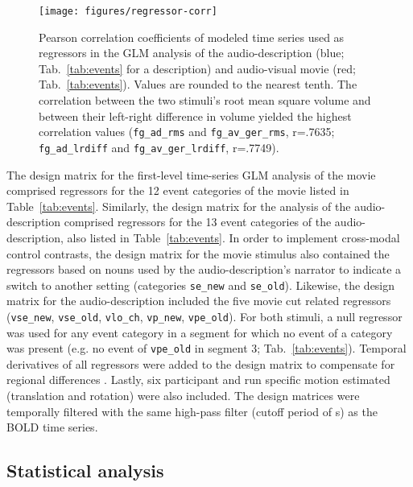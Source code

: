 \documentclass[english]{article}
\begin{document}
\begin{figure*}[tbp]
\centering
    \texttt{[image: figures/regressor-corr]} \caption{Pearson
        correlation coefficients of modeled time series used as regressors in
        the GLM analysis of the
        audio-description (blue; Tab.~\ref{tab:events} for a
        description) and audio-visual movie (red; Tab.~\ref{tab:events}).
        Values are rounded to the nearest tenth.
        The correlation between the two stimuli's
        root mean square volume and between their left-right difference in
        volume yielded the highest correlation values
        (\texttt{fg\_ad\_rms} and \texttt{fg\_av\_ger\_rms}, r=.7635;
        \texttt{fg\_ad\_lrdiff} and \texttt{fg\_av\_ger\_lrdiff}, r=.7749).
      }
\label{fig:reg-corr}
\end{figure*}


The design matrix for the first-level time-series GLM analysis of the movie
comprised regressors for the 12 event categories of the movie listed in
Table~\ref{tab:events}.
Similarly, the design matrix for the analysis of the audio-description comprised
regressors for the 13 event categories of the audio-description, also listed in
Table~\ref{tab:events}.
In order to implement cross-modal control contrasts, the design matrix for the
movie stimulus also contained the regressors based on nouns used by the
audio-description's narrator to indicate a switch to another setting (categories
\texttt{se\_new} and \texttt{se\_old}).
Likewise, the design matrix for the audio-description included the five movie
cut related regressors (\texttt{vse\_new}, \texttt{vse\_old}, \texttt{vlo\_ch},
\texttt{vp\_new}, \texttt{vpe\_old}).
For both stimuli, a null regressor was used for any event category in a segment
for which no event of a category was present (e.g. no event of \texttt{vpe\_old}
in segment 3; Tab.~\ref{tab:events}).
Temporal derivatives of all regressors were added to the design matrix to
compensate for regional differences \citep{friston1998event}.
Lastly, six participant and run specific motion estimated (translation and
rotation) were also included.
The design matrices were temporally filtered with the same high-pass filter
(cutoff period of \unit[150]{s}) as the BOLD time series.


\subsection{Statistical analysis}
\end{document}
